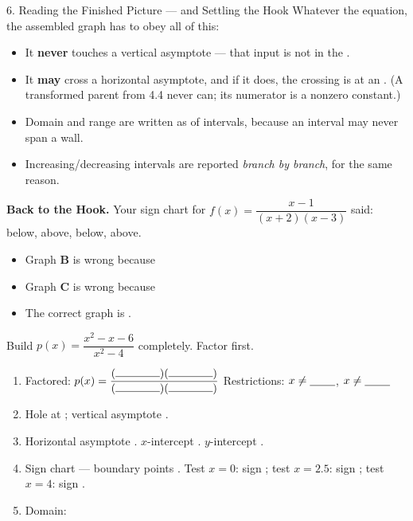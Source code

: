 \documentclass[10pt]{article}
\begin{document}
\begin{notesbox}{6. Reading the Finished Picture --- and Settling the Hook}
Whatever the equation, the assembled graph has to obey all of this:
\begin{itemize}[leftmargin=1.5em, itemsep=3pt]
  \item It \textbf{never} touches a vertical asymptote --- that input is not in the \blank{1.8cm}.
  \item It \textbf{may} cross a horizontal asymptote, and if it does, the crossing is at an
        \blank{2.4cm}. (A transformed parent from 4.4 never can; its numerator is a nonzero
        constant.)
  \item Domain and range are written as \blank{1.4cm} of intervals, because an interval may never
        span a wall.
  \item Increasing/decreasing intervals are reported \emph{branch by branch}, for the same reason.
\end{itemize}

\vspace{4pt}
\textbf{Back to the Hook.} Your sign chart for $f(x)=\dfrac{x-1}{(x+2)(x-3)}$ said: below, above,
below, above.
\begin{itemize}[leftmargin=1.5em, itemsep=2pt]
  \item Graph \textbf{B} is wrong because \writeline
  \item Graph \textbf{C} is wrong because \writeline
  \item The correct graph is \blank{1.0cm}.
\end{itemize}
\end{notesbox}

\begin{practicebox}
Build $p(x)=\dfrac{x^2-x-6}{x^2-4}$ completely. Factor first.
\begin{enumerate}[leftmargin=1.7em, itemsep=5pt]
  \item Factored: $p(x)=\dfrac{(\rule{1.4cm}{0.4pt})(\rule{1.4cm}{0.4pt})}%
        {(\rule{1.4cm}{0.4pt})(\rule{1.4cm}{0.4pt})}$ \quad Restrictions: $x\neq\blank{0.8cm}$,
        $x\neq\blank{0.8cm}$
  \item Hole at \blank{2.0cm}; \quad vertical asymptote \blank{1.6cm}.
  \item Horizontal asymptote \blank{1.6cm}. \quad $x$-intercept \blank{1.6cm}. \quad
        $y$-intercept \blank{1.6cm}.
  \item Sign chart --- boundary points \blank{2.4cm}. Test $x=0$: sign \blank{1.0cm}; \;
        test $x=2.5$: sign \blank{1.0cm}; \; test $x=4$: sign \blank{1.0cm}.
  \item Domain: \blank{5.4cm}
\end{enumerate}
\end{practicebox}
\end{document}
